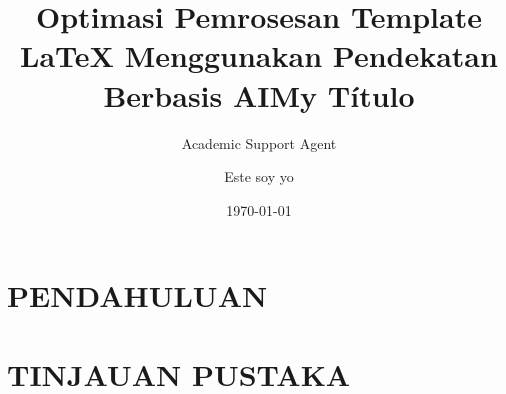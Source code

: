 \documentclass{unex}
\title{Optimasi Pemrosesan Template LaTeX Menggunakan Pendekatan Berbasis AI}
\author{Academic Support Agent}
\date{\today}
\begin{document}
\maketitle

\begin{abstract}

\end{abstract}

\chapter{PENDAHULUAN}


\chapter{TINJAUAN PUSTAKA}




\usepackage[spanish]{babel}
\graphicspath{{./images/}}
\usepackage{listings} %
\usepackage{url} %
\usepackage[colorlinks=true,
                    urlcolor=black, %
                    linkcolor=black,
                    citecolor=black, %
                    bookmarks=true,
                    pdfstartview=FitH]{hyperref}

\usepackage[style=apa,backend=biber]{biblatex}


\usepackage{lipsum}

\usepackage{tabulary}


\title{My Título}

\author{Este soy yo}





\makenoidxglossaries
{}


\usepackage{etoolbox}
\end{document}
